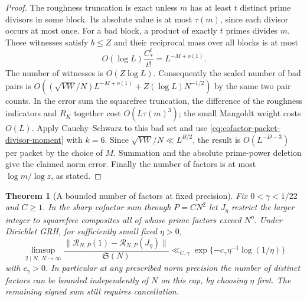 \documentclass[11pt,a4paper]{article}
\numberwithin{equation}{section}
\newtheorem{theorem}{Theorem}[section]
\newcommand{\SSS}{\mathfrak S}
\begin{document}
\begin{proof}
The roughness truncation is exact unless $m$ has at least $t$
distinct prime divisors in some block. Its absolute value is at
most $\tau(m)$, since each divisor occurs at most once. For a
bad block, a product of exactly $t$ primes divides $m$. These
witnesses satisfy $b\le Z$ and their reciprocal mass over all
blocks is at most
\[
 O(\log L)\frac{C_*^t}{t!}=L^{-M+o(1)}.
\]
The number of witnesses is $O(Z\log L)$. Consequently the
scaled number of bad pairs is
$O((\sqrt{VW}/N)L^{-M+o(1)}+Z(\log L)N^{-1/2})$ by the
same two pair counts. In the error sum the squarefree truncation,
the difference of the roughness indicators and $R_K$ together
cost $O(L\tau(m)^3)$; the small Mangoldt weight costs $O(L)$.
Apply Cauchy--Schwarz to this bad set and use
\eqref{eq:cofactor-packet-divisor-moment} with $k=6$. Since
$\sqrt{VW}/N\ll L^{B/2}$, the result is $O(L^{-D-3})$ per
packet by the choice of $M$. Summation and the absolute
prime-power deletion give the claimed norm error. Finally
the number of factors is at most $\log m/\log z$, as stated.
\end{proof}

\begin{theorem}[A bounded number of factors at fixed precision]
\label{thm:fixed-precision-rough}
Fix $0<\gamma<1/22$ and $C\ge1$. In the sharp cofactor sum
through $P=CN^2$ let $J_\eta$ restrict the larger integer to
squarefree composites all of whose prime factors exceed $N^\eta$.
Under Dirichlet GRH, for sufficiently small fixed $\eta>0$,
\[
 \limsup_{2\mid N,\ N\to\infty}
 \frac{\|\mathcal R_{N,P}(1)-\mathcal R_{N,P}(J_\eta)\|}{\SSS(N)}
 \ll_{C,\gamma}\exp\{-c_\gamma\eta^{-1}\log(1/\eta)\}
\]
with $c_\gamma>0$. In particular at any prescribed norm precision
the number of distinct factors can be bounded independently of
$N$ on this cap, by choosing $\eta$ first. The remaining signed
sum still requires cancellation.
\end{theorem}
\end{document}
